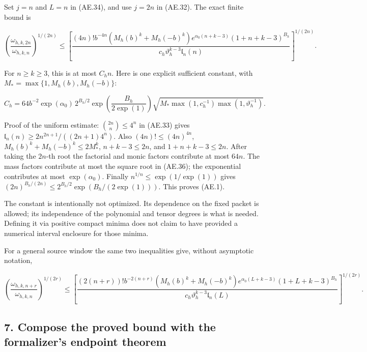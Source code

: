 Set \(j=n\) and \(L=n\) in (AE.34), and use \(j=2n\) in (AE.32). The exact
finite bound is

\[
 \boxed{
 \left(\frac{\omega_{h,k,2n}}{\omega_{h,k,n}}\right)^{1/(2n)}
 \le\left[
 \frac{(4n)!b^{-4n}(M_h(b)^k+M_h(-b)^k)
       e^{\alpha_0(n+k-3)}(1+n+k-3)^{B_h}}
      {c_h\vartheta_h^{k-3}\mathfrak l_n(n)}
       \right]^{1/(2n)}.}                                              \tag{AE.35}\label{AE.eq.35}
\]

For \(n\ge k\ge3\), this is at most \(C_hn\). Here is one explicit
sufficient constant, with \(M_* =\max\{1,M_h(b),M_h(-b)\}\):

\[
 \boxed{
 C_h=64b^{-2}\exp(\alpha_0)\,2^{B_h/2}
       \exp\!\left(\frac{B_h}{2\exp(1)}\right)
       \sqrt{M_*\max(1,c_h^{-1})\max(1,\vartheta_h^{-1})}.
 }                                                                     \tag{AE.36}\label{AE.eq.36}
\]

Proof of the uniform estimate: \(\binom{2n}{n}\le4^n\) in (AE.33) gives
\(\mathfrak l_n(n)\ge2n^{2n+1}/((2n+1)4^n)\). Also
\((4n)!\le(4n)^{4n}\), \(M_h(b)^k+M_h(-b)^k\le2M_*^k\), \(n+k-3\le2n\),
and \(1+n+k-3\le2n\). After taking the \(2n\)-th root the factorial and
monic factors contribute at most \(64n\). The mass factors contribute at
most the square root in (AE.36); the exponential contributes at most
\(\exp(\alpha_0)\). Finally \(n^{1/n}\le\exp(1/\exp(1))\) gives
\((2n)^{B_h/(2n)}\le2^{B_h/2}\exp(B_h/(2\exp(1)))\). This proves (AE.1).

The constant is intentionally not optimized. Its dependence on the fixed
packet is allowed; its independence of the polynomial and tensor degrees
is what is needed. Defining it via positive compact minima does not
claim to have provided a numerical interval enclosure for those minima.

For a general source window the same two inequalities give, without
asymptotic notation,

\[
 \left(\frac{\omega_{h,k,n+r}}{\omega_{h,k,n}}\right)^{1/(2r)}
 \le\left[
 \frac{(2(n+r))!b^{-2(n+r)}(M_h(b)^k+M_h(-b)^k)
       e^{\alpha_0(L+k-3)}(1+L+k-3)^{B_h}}
      {c_h\vartheta_h^{k-3}\mathfrak l_n(L)}
       \right]^{1/(2r)}.                                               \tag{AE.37}\label{AE.eq.37}
\]

\subsection*{7. Compose the proved bound with the formalizer's endpoint
theorem}
\label{AE.compose-the-proved-bound-with-the-formalizers-endpoint-theorem}


